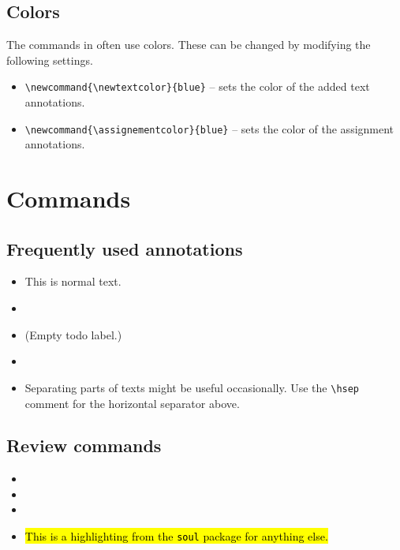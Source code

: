 \documentclass{article}
\begin{document}
\subsection{Colors}

The commands in  often use colors. These can be changed by modifying the following settings.
\begin{itemize}
    \item \verb|\newcommand{\newtextcolor}{blue}| -- sets the color of the added text annotations.
    \item \verb|\newcommand{\assignementcolor}{blue}| -- sets the color of the assignment annotations.
\end{itemize}





\section{Commands}\label{sec:commands}

\subsection{Frequently used annotations}

\begin{itemize}
    \item This is normal text.
    \item {}
    \item \todo{} (Empty todo label.)
    \item {}
\end{itemize}

\hsep

\begin{itemize}
    \item Separating parts of texts might be useful occasionally. Use the \texttt{\textbackslash hsep} comment for the horizontal separator above.
\end{itemize}

\subsection{Review commands}

\begin{itemize}
    \item {}
    \item {}
    \item {}
    \item \hl{This is a highlighting from the \texttt{soul} package for anything else.}
\end{itemize}
\end{document}
